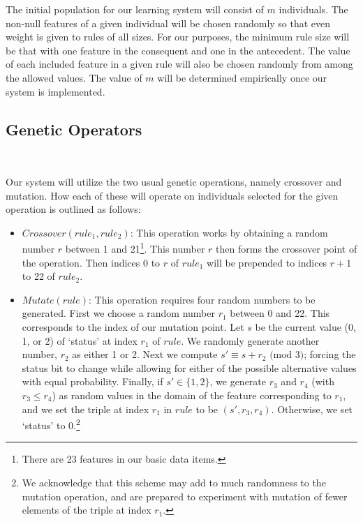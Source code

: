 \documentclass{amsart}
\theoremstyle{definition}
\theoremstyle{remark}
\numberwithin{equation}{section}
\begin{document}
The initial population for our learning system will consist of $m$ individuals. The non-null features of a given individual will be chosen randomly so that even weight is given to rules of all sizes. For our purposes, the minimum rule size will be that with one feature in the consequent and one in the antecedent. The value of each included feature in a given rule will also be chosen randomly from among the allowed values. The value of $m$ will be determined empirically once our system is implemented.\newline 

\subsection{Genetic Operators}
~\newline

Our system will utilize the two usual genetic operations, namely crossover and mutation. How each of these will operate on individuals selected for the given operation is outlined as follows:

\begin{itemize}
	\item $Crossover(rule_1,rule_2)$: This operation works by obtaining a random number $r$ between 1 and 21\footnote{There are 23 features in our basic data items.}. This number $r$ then forms the crossover point of the operation. Then indices 0 to $r$ of $rule_1$ will be prepended to indices $r+1$ to 22 of $rule_2$.
	\item$Mutate(rule)$: This operation requires four random numbers to be generated. First we choose a random number $r_1$ between 0 and 22. This corresponds to the index of our mutation point. Let $s$ be the current value (0, 1, or 2) of `status' at index $r_1$ of $rule$. We randomly generate another number, $r_2$ as either 1 or 2. Next we compute $s' \equiv s + r_2\text{ (mod }3)$; forcing the status bit to change while allowing for either of the possible alternative values with equal probability. Finally, if $s' \in \{1,2\}$, we generate $r_3$ and $r_4$ (with $r_3 \leq r_4$) as random values in the domain of the feature corresponding to $r_1$, and we set the triple at index $r_1$ in $rule$ to be $(s', r_3, r_4)$. Otherwise, we set `status' to 0.\footnote{We acknowledge that this scheme may add to much randomness to the mutation operation, and are prepared to experiment with mutation of fewer elements of the triple at index $r_1$.}\newline
\end{itemize}
\end{document}
